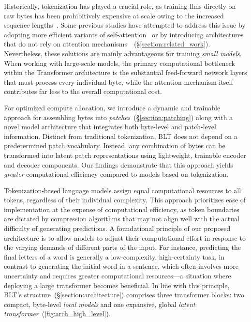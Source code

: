 Historically, tokenization has played a crucial role, as training llms directly on raw bytes has been prohibitively expensive at scale owing to the increased sequence lengths~\citep{xue2022byt5}. Some previous studies have attempted to address this issue by adopting more efficient variants of self-attention~\citep{el2020characterbert, clark2022canine} or by introducing architectures that do not rely on attention mechanisms~\citep{wang2024mambabyte}~(\S\ref{section:related_work}). Nevertheless, these solutions are mainly advantageous for training \textit{small models}. When working with large-scale models, the primary computational bottleneck within the Transformer architecture is the substantial feed-forward network layers that must process every individual byte, while the attention mechanism itself contributes far less to the overall computational cost.

For optimized compute allocation, we introduce a dynamic and trainable approach for assembling bytes into \textit{patches}~(\S\ref{section:patching}) along with a novel model architecture that integrates both byte-level and patch-level information. Distinct from traditional tokenization, {\textsc BLT} does not depend on a predetermined patch vocabulary. Instead, any combination of bytes can be transformed into latent patch representations using lightweight, trainable encoder and decoder components. Our findings demonstrate that this approach yields \textit{greater} computational efficiency compared to models based on tokenization.

Tokenization-based language models assign equal computational resources to all tokens, regardless of their individual complexity. This approach prioritizes ease of implementation at the expense of computational efficiency, as token boundaries are dictated by compression algorithms that may not align well with the actual difficulty of generating predictions. A foundational principle of our proposed architecture is to allow models to adjust their computational effort in response to the varying demands of different parts of the input. For instance, predicting the final letters of a word is generally a low-complexity, high-certainty task, in contrast to generating the initial word in a sentence, which often involves more uncertainty and requires greater computational resources—a situation where deploying a large transformer becomes beneficial. In line with this principle, {\textsc BLT}'s structure~(\S\ref{section:architecture}) comprises three transformer blocks: two compact, byte-level \textit{local models} and one expansive, global \textit{latent transformer}~(\autoref{fig:arch_high_level}).

